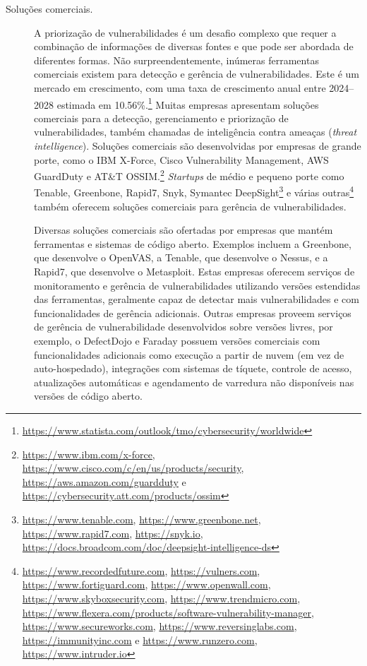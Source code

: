 \begin{description}
    \item[Soluções comerciais.] A priorização de vulnerabilidades é um desafio complexo que requer a combinação de informações de diversas fontes e que pode ser abordada de diferentes formas. Não surpreendentemente, inúmeras ferramentas comerciais existem para detecção e gerência de vulnerabilidades. Este é um mercado em crescimento, com uma taxa de crescimento anual entre 2024--2028 estimada em 10.56\%.\footnote{\url{https://www.statista.com/outlook/tmo/cybersecurity/worldwide}} Muitas empresas apresentam soluções comerciais para a detecção, gerenciamento e priorização de vulnerabilidades, também chamadas de inteligência contra ameaças (\emph{threat intelligence}).
    Soluções comerciais são desenvolvidas por empresas de grande porte, como o IBM X-Force, Cisco Vulnerability Management, AWS GuardDuty e AT\&T OSSIM.\footnote{\url{https://www.ibm.com/x-force}, \url{https://www.cisco.com/c/en/us/products/security}, \url{https://aws.amazon.com/guardduty} e \url{https://cybersecurity.att.com/products/ossim}}
    \emph{Startups} de médio e pequeno porte como Tenable, Greenbone, Rapid7, Snyk, Symantec DeepSight\footnote{\url{https://www.tenable.com}, \url{https://www.greenbone.net}, \url{https://www.rapid7.com}, \url{https://snyk.io}, \url{https://docs.broadcom.com/doc/deepsight-intelligence-ds}} e várias outras\footnote{\url{https://www.recordedfuture.com}, \url{https://vulners.com}, \url{https://www.fortiguard.com}, \url{https://www.openwall.com}, \url{https://www.skyboxsecurity.com}, \url{https://www.trendmicro.com}, \url{https://www.flexera.com/products/software-vulnerability-manager}, \url{https://www.secureworks.com}, \url{https://www.reversinglabs.com}, \url{https://immunityinc.com} e \url{https://www.runzero.com}, \url{https://www.intruder.io}} também oferecem soluções comerciais para gerência de vulnerabilidades.

    Diversas soluções comerciais são ofertadas por empresas que mantém ferramentas e sistemas de código aberto. Exemplos incluem a Greenbone, que desenvolve o OpenVAS, a Tenable, que desenvolve o Nessus, e a Rapid7, que desenvolve o Metasploit. Estas empresas oferecem serviços de monitoramento e gerência de vulnerabilidades utilizando versões estendidas das ferramentas, geralmente capaz de detectar mais vulnerabilidades e com funcionalidades de gerência adicionais. Outras empresas proveem serviços de gerência de vulnerabilidade desenvolvidos sobre versões livres, por exemplo, o DefectDojo e Faraday possuem versões comerciais com funcionalidades adicionais como execução a partir de nuvem (em vez de auto-hospedado), integrações com sistemas de tíquete, controle de acesso, atualizações automáticas e agendamento de varredura não disponíveis nas versões de código aberto.

\end{description}

